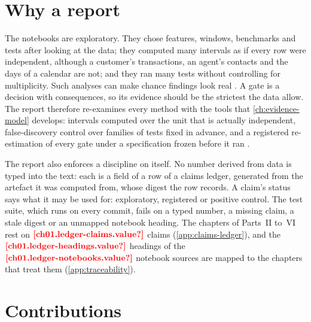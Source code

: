 \section{Why a report}\label{sec:intro-why}

The notebooks are exploratory. They chose features, windows, benchmarks and tests after looking at the data; they
computed many intervals as if every row were independent, although a customer's transactions, an agent's contacts and
the days of a calendar are not; and they ran many tests without controlling for multiplicity. Such analyses can make
chance findings look real \autocite{simmons2011}. A gate is a decision with consequences, so its evidence should be the
strictest the data allow. The report therefore re-examines every method with the tools that \cref{ch:evidence-model}
develops: intervals computed over the unit that is actually independent, false-discovery control over families of tests
fixed in advance, and a registered re-estimation of every gate under a specification frozen before it ran
\autocite{nosek2018}.

The report also enforces a discipline on itself. No number derived from data is typed into the text: each is a field of
a row of a claims ledger, generated from the artefact it was computed from, whose digest the row records. A claim's
status says what it may be used for: exploratory, registered or positive control. The test suite, which runs on every
commit, fails on a typed number, a
missing claim, a stale digest or an unmapped notebook heading. The chapters of Parts~II to~VI rest on
$\est{ch01.ledger-claims}{value}$ claims (\cref{app:claims-ledger}), and the $\est{ch01.ledger-headings}{value}$
headings of the $\est{ch01.ledger-notebooks}{value}$ notebook sources are mapped to the chapters that treat them
(\cref{app:traceability}).

\section{Contributions}\label{sec:intro-contributions}

